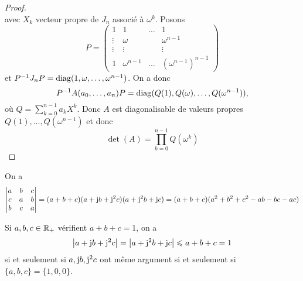 \documentclass[12pt]{article}
\begin{document}
\begin{proof}
\begin{equation}
	\end{equation}
	avec $X_{k}$ vecteur propre de $J_{n}$ associé à $\omega^{k}$. Posons 
	\begin{equation}
		P=
		\begin{pmatrix}
			1&1&\dots&1\\
			\vdots&\omega&&\omega^{n-1}\\
			\vdots&\vdots&&\vdots\\
			1&\omega^{n-1}&\dots&(\omega^{n-1})^{n-1}
		\end{pmatrix}
	\end{equation}
	et $P^{-1}J_{n}P=\operatorname{diag}(1,\omega,\dots,\omega^{n-1})$. On a donc 
	\begin{equation*}
		P^{-1}A(a_{0},\dots,a_{n})P=\operatorname{diag}(Q(1),Q(\omega),\dots,Q(\omega^{n-1})),
	\end{equation*} où $Q=\sum_{k=0}^{n-1}a_{k}X^{k}$.
	Donc $A$ est diagonalisable de valeurs propres $Q(1),\dots,Q(\omega^{n-1})$ et donc
	\begin{equation}
		\boxed{\det(A)=\prod_{k=0}^{n-1}Q(\omega^{k})}
	\end{equation}
\end{proof}

\begin{remark}
	On a 
	\begin{equation}
		\begin{vmatrix}
			a&b&c\\
			c&a&b\\
			b&c&a
		\end{vmatrix}=(a+b+c)(a+\mathrm{j} b+\mathrm{j}^{2}c)(a+\mathrm{j}^{2}b+\mathrm{j} c)=(a+b+c)(a^{2}+b^{2}+c^{2}-ab-bc-ac)
	\end{equation}

	Si $a,b,c\in\mathbb{R}_{+}$ vérifient $a+b+c=1$, on a 
	\begin{equation}
		\left\lvert a+\mathrm{j} b+\mathrm{j}^{2}c\right\rvert=\left\lvert a+\mathrm{j}^{2}b+\mathrm{j} c\right\rvert\leqslant a+b+c=1
	\end{equation}
	si et seulement si $a,\mathrm{j} b,\mathrm{j}^{2}c$ ont même argument si et seulement si $\lbrace a,b,c\rbrace=\lbrace1,0,0\rbrace$.
\end{remark}
\end{document}
